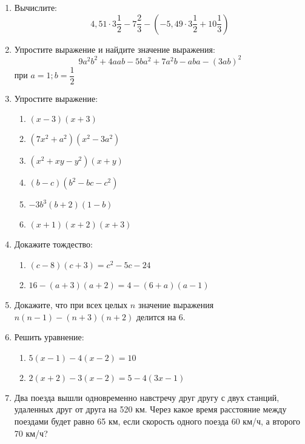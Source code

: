 \documentclass[12pt, a4paper]{article}
\begin{document}
		

\begin{enumerate}
	\item Вычислите:
	$$4,51\cdot3\dfrac{1}{2}-7\dfrac{2}{3}-\left(-5,49\cdot3\dfrac{1}{2}+10\dfrac{1}{3}\right)$$
	\item Упростите выражение и найдите значение выражения:
	$$9a^2b^2+4aab-5ba^2+7a^2b-aba-(3ab)^2$$ при $a=1; b=\dfrac{1}{2}$
	\item Упростите выражение:
	\begin{multicols}{2}
		\begin{enumerate}[label=\asbuk*)]
			\item $(x-3)(x+3)$
			\item $(7x^2+a^2)(x^2-3a^2)$
			\item $(x^2+xy-y^2)(x+y)$
			\item $(b-c)(b^2-bc-c^2)$
			\item $-3b^3(b+2)(1-b)$
			\item $(x+1)(x+2)(x+3)$
		\end{enumerate}
	\end{multicols}
	\item Докажите тождество:
	\begin{multicols}{2}
		\begin{enumerate}[label=\asbuk*)]
			\item $(c-8)(c+3)=c^2-5c-24$
			\item $16-(a+3)(a+2)=4-(6+a)(a-1)$
		\end{enumerate}
	\end{multicols}
	\item Докажите, что при всех целых $n$ значение выражения
	$n(n-1)-(n+3)(n+2)$
	делится на 6.
	\item Решить уравнение:
	\begin{multicols}{2}
		\begin{enumerate}[label=\asbuk*)]
			\item $5(x-1)-4(x-2)=10$
			\item $2(x+2)-3(x-2)=5-4(3x-1)$
		\end{enumerate}
	\end{multicols}
	\item Два поезда вышли одновременно навстречу друг другу с двух станций, удаленных друг от друга на 520 км. Через какое время расстояние между поездами будет равно 65 км, если скорость одного поезда 60 км/ч, а второго 70 км/ч?
\end{enumerate}
\end{document}
